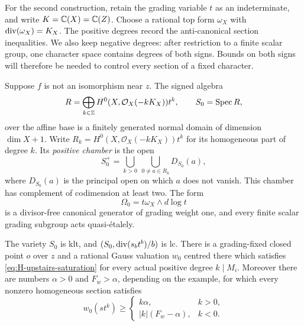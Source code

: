 For the second construction, retain the grading variable $t$ as an
indeterminate, and write $K=\mathbb C(X)=\mathbb C(Z)$.
Choose a rational top form $\omega_X$ with $\operatorname{div}(\omega_X)=K_X$.
The positive degrees record the anti-canonical section inequalities.
We also keep negative degrees: after restriction to a finite scalar
group, one character space contains degrees of both signs.  Bounds on
both signs will therefore be needed to control every section of a
fixed character.

\begin{lemma}\label{lem:H-signed-torsor}
Suppose $f$ is not an isomorphism near $z$.  The signed algebra
\begin{equation}\label{eq:H-signed-algebra}
 R=\bigoplus_{k\in\mathbb Z}
       H^0(X,\mathcal O_X(-kK_X))t^k,\qquad S_0=\operatorname{Spec} R,
\end{equation}
over the affine base is a finitely generated normal domain of dimension
$\dim X+1$. Write $R_k=H^0(X,\mathcal O_X(-kK_X))t^k$ for its
homogeneous part of degree $k$. Its \emph{positive chamber} is the open
\[
 S_0^+=\bigcup_{k>0}\ \bigcup_{0\ne a\in R_k}D_{S_0}(a),
\]
where $D_{S_0}(a)$ is the principal open on which $a$ does not vanish.
This chamber has complement of codimension at least two. The form
\begin{equation}\label{eq:H-torsor-form}
 \Omega_0=t\omega_X\wedge d\log t
\end{equation}
is a divisor-free canonical generator of grading weight one, and every
finite scalar grading subgroup acts quasi-\'{e}talely.

The variety $S_0$ is klt, and
$(S_0,\operatorname{div}(s_bt^b)/b)$ is lc.  There is a grading-fixed closed point
$o$ over $z$ and a rational Gauss valuation $w_0$ centred there which
satisfies \eqref{eq:H-upstairs-saturation} for every actual positive
degree $k\mid M_i$.  Moreover there are numbers $\alpha>0$ and
$F_w>\alpha$, depending on the example, for which every nonzero
homogeneous section satisfies
\begin{equation}\label{eq:H-two-slopes}
 w_0(s t^k)\ge
 \begin{cases}
 k\alpha,&k>0,\\
 |k|(F_w-\alpha),&k<0.
 \end{cases}
\end{equation}
\end{lemma}
